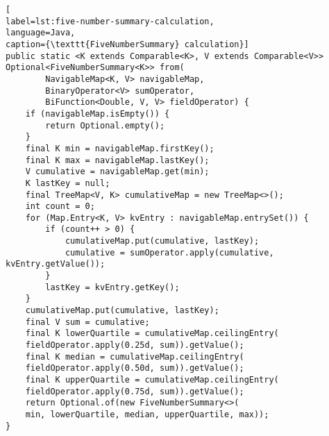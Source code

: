 \documentclass{article}
\begin{document}
\begin{lstlisting}[
label=lst:five-number-summary-calculation,
language=Java,
caption={\texttt{FiveNumberSummary} calculation}]
public static <K extends Comparable<K>, V extends Comparable<V>>
Optional<FiveNumberSummary<K>> from(
        NavigableMap<K, V> navigableMap,
        BinaryOperator<V> sumOperator,
        BiFunction<Double, V, V> fieldOperator) {
    if (navigableMap.isEmpty()) {
        return Optional.empty();
    }
    final K min = navigableMap.firstKey();
    final K max = navigableMap.lastKey();
    V cumulative = navigableMap.get(min);
    K lastKey = null;
    final TreeMap<V, K> cumulativeMap = new TreeMap<>();
    int count = 0;
    for (Map.Entry<K, V> kvEntry : navigableMap.entrySet()) {
        if (count++ > 0) {
            cumulativeMap.put(cumulative, lastKey);
            cumulative = sumOperator.apply(cumulative, kvEntry.getValue());
        }
        lastKey = kvEntry.getKey();
    }
    cumulativeMap.put(cumulative, lastKey);
    final V sum = cumulative;
    final K lowerQuartile = cumulativeMap.ceilingEntry(
    fieldOperator.apply(0.25d, sum)).getValue();
    final K median = cumulativeMap.ceilingEntry(
    fieldOperator.apply(0.50d, sum)).getValue();
    final K upperQuartile = cumulativeMap.ceilingEntry(
    fieldOperator.apply(0.75d, sum)).getValue();
    return Optional.of(new FiveNumberSummary<>(
    min, lowerQuartile, median, upperQuartile, max));
}
\end{lstlisting}



\medskip

\end{document}
